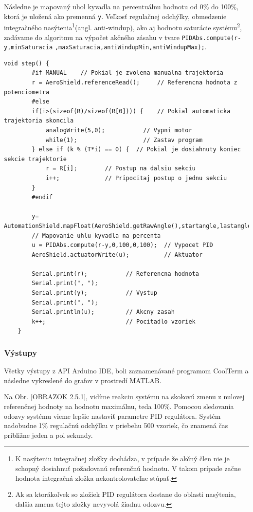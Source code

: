 Následne je mapovaný uhol kyvadla na percentuálnu hodnotu od 0\% do 100\%, ktorá je uložená ako premenná \verb|y|. Veľkosť regulačnej odchýlky, obmedzenie integračného nasýtenia\footnote[11]{K nasýteniu integračnej zložky dochádza, v prípade že akčný člen nie je schopný dosiahnuť požadovanú referenčnú
	hodnotu. V takom prípade začne hodnota integračná zložka nekontrolovateľne stúpať.}(angl. anti-windup), ako aj hodnotu saturácie systému\footnote[12]{Ak sa ktorákoľvek so zložiek PID regulátora dostane do oblasti nasýtenia, ďalšia zmena tejto zložky nevyvolá žiadnu odozvu.}, zadávame do algoritmu na výpočet akčného zásahu v tvare \verb|PIDAbs.compute(r-y,minSaturacia|
\verb|,maxSaturacia,antiWindupMin,antiWindupMax);|. 


\begin{lstlisting}[caption={Funkcia step().},captionpos=b]
	void step() {            
		#if MANUAL    // Pokial je zvolena manualna trajektoria 
		r = AeroShield.referenceRead();     // Referencna hodnota z potenciometra
		#else         
		if(i>(sizeof(R)/sizeof(R[0]))) {    // Pokial automaticka trajektoria skoncila
			analogWrite(5,0);           // Vypni motor
			while(1);                   // Zastav program
		} else if (k % (T*i) == 0) {  // Pokial je dosiahnuty koniec       sekcie trajektorie
			r = R[i];        // Postup na dalsiu sekciu
			i++;             // Pripocitaj postup o jednu sekciu 
		}
		#endif
		
		y= AutomationShield.mapFloat(AeroShield.getRawAngle(),startangle,lastangle,0.00,100.00);
		// Mapovanie uhlu kyvadla na percenta 
		u = PIDAbs.compute(r-y,0,100,0,100);  // Vypocet PID 
		AeroShield.actuatorWrite(u);          // Aktuator
		
		Serial.print(r);           // Referencna hodnota 
		Serial.print(", ");
		Serial.print(y);           // Vystup 
		Serial.print(", ");
		Serial.println(u);         // Akcny zasah 
		k++;                       // Pocitadlo vzoriek 
	}
\end{lstlisting}

\subsubsection{Výstupy}

Všetky výstupy z API Arduino IDE, boli zaznamenávané programom CoolTerm a následne vykreslené do grafov v prostredí MATLAB. 

Na Obr. \ref{OBRAZOK 2.5.1}, vidíme reakciu systému na skokovú zmenu z nulovej referenčnej hodnoty na hodnotu maximálnu, teda 100\%. Pomocou sledovania odozvy systému vieme lepšie nastaviť parametre PID regulátora. Systém nadobudne 1\% regulačnú odchýlku v priebehu 500 vzoriek, čo znamená čas približne jeden a pol sekundy. 

